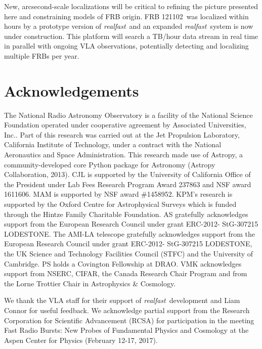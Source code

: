\documentclass[twocolumn]{aastex61}
\newcommand{\rf}{\emph{realfast}}
\newcommand{\frb}{FRB 121102}
\begin{document}
New, arcsecond-scale localizations will be critical to refining the picture presented here and constraining models of FRB origin. \frb\ was localized within hours by a prototype version of \rf\ and an expanded \rf\ system is now under construction. This platform will search a TB/hour data stream in real time in parallel with ongoing VLA observations, potentially detecting and localizing multiple FRBs per year.



\section*{Acknowledgements}
The National Radio Astronomy Observatory is a facility of the National Science Foundation operated under cooperative agreement by Associated Universities, Inc..
Part of this research was carried out at the Jet Propulsion Laboratory, California Institute of Technology, under a contract with the National Aeronautics and Space Administration.
This research made use of Astropy, a community-developed core Python package for Astronomy (Astropy Collaboration, 2013).
CJL is supported by the University of California Office of the President under Lab Fees Research Program Award 237863 and NSF award 1611606. MAM is supported by NSF award \#1458952. KPM's research is supported by the Oxford Centre for Astrophysical Surveys which is funded through the Hintze Family Charitable Foundation. AS gratefully acknowledges support from the European Research Council under grant ERC-2012- StG-307215 LODESTONE. The AMI-LA telescope gratefully acknowledges support from the European Research Council under grant ERC-2012- StG-307215 LODESTONE, the UK Science and Technology Facilities Council (STFC) and the University of Cambridge. PS holds a Covington Fellowship at DRAO.
VMK acknowledges support from NSERC, CIFAR, the Canada Research Chair Program and from the Lorne Trottier Chair in Astrophysics \& Cosmology.

We thank the VLA staff for their support of \rf\ development and Liam Connor for useful feedback. We acknowledge partial support from the Research Corporation for Scientific Advancement (RCSA) for participation in the meeting Fast Radio Bursts: New Probes of Fundamental Physics and Cosmology at the Aspen Center for Physics (February 12-17, 2017).



\end{document}
